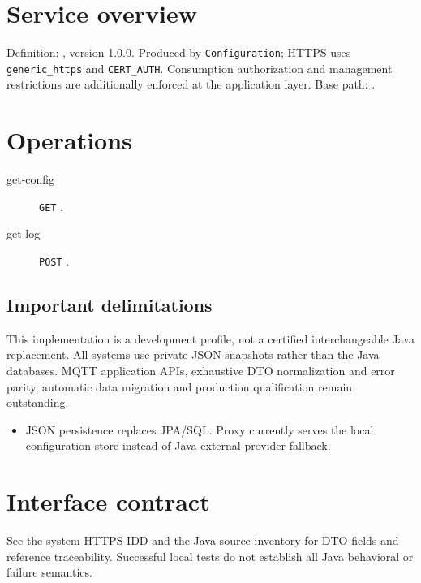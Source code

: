 \documentclass[a4paper]{arrowhead}
\begin{document}
\ArrowheadSetup
\section{Service overview}
Definition: , version 1.0.0. Produced by \texttt{Configuration}; HTTPS uses \texttt{generic\_https} and \texttt{CERT\_AUTH}. Consumption authorization and management restrictions are additionally enforced at the application layer. Base path: .
\section{Operations}
\begin{description}
\item[get-config] \texttt{GET} .
\item[get-log] \texttt{POST} .
\end{description}
\subsection{Important delimitations}
This implementation is a development profile, not a certified interchangeable Java replacement. All systems use private JSON snapshots rather than the Java databases. MQTT application APIs, exhaustive DTO normalization and error parity, automatic data migration and production qualification remain outstanding.
\begin{itemize}
\item JSON persistence replaces JPA/SQL. Proxy currently serves the local configuration store instead of Java external-provider fallback.
\end{itemize}
\section{Interface contract}
See the system HTTPS IDD and the Java source inventory for DTO fields and reference traceability. Successful local tests do not establish all Java behavioral or failure semantics.
\end{document}
